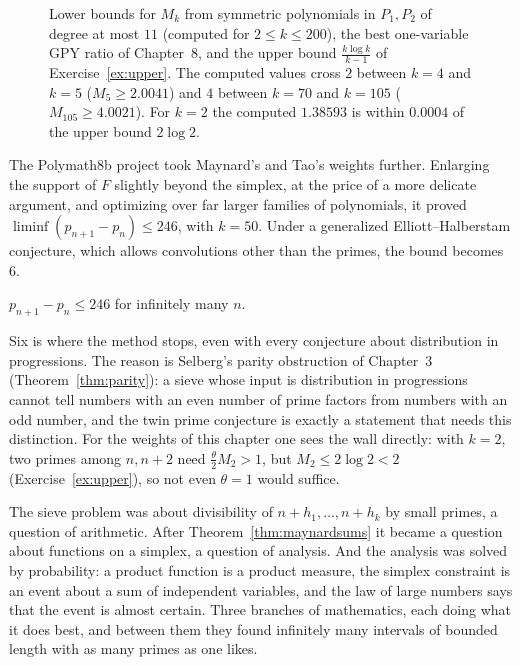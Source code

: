 \begin{figure}[ht]
\centering
{}
\caption{Lower bounds for $M_k$ from symmetric polynomials in $P_1,P_2$ of degree at most $11$ (computed for $2\le k\le200$), the best one-variable GPY ratio of Chapter~8, and the upper bound $\frac{k\log k}{k-1}$ of Exercise~\ref{ex:upper}. The computed values cross $2$ between $k=4$ and $k=5$ ($M_5\ge2.0041$) and $4$ between $k=70$ and $k=105$ ($M_{105}\ge4.0021$). For $k=2$ the computed $1.38593$ is within $0.0004$ of the upper bound $2\log2$.}
\label{fig:mk}
\end{figure}

The Polymath8b project took Maynard's and Tao's weights further. Enlarging the support of $F$ slightly beyond the simplex, at the price of a more delicate argument, and optimizing over far larger families of polynomials, it proved $\liminf(p_{n+1}-p_n)\le246$, with $k=50$. Under a generalized Elliott--Halberstam conjecture, which allows convolutions other than the primes, the bound becomes $6$.

\begin{theorem}\label{thm:246}
$p_{n+1}-p_n\le246$ for infinitely many $n$.
\end{theorem}

Six is where the method stops, even with every conjecture about distribution in progressions. The reason is Selberg's parity obstruction of Chapter~3 (Theorem~\ref{thm:parity}): a sieve whose input is distribution in progressions cannot tell numbers with an even number of prime factors from numbers with an odd number, and the twin prime conjecture is exactly a statement that needs this distinction. For the weights of this chapter one sees the wall directly: with $k=2$, two primes among $n,n+2$ need $\frac\theta2M_2>1$, but $M_2\le2\log2<2$ (Exercise~\ref{ex:upper}), so not even $\theta=1$ would suffice.

\begin{beauty}
The sieve problem was about divisibility of $n+h_1,\dots,n+h_k$ by small primes, a question of arithmetic. After Theorem~\ref{thm:maynardsums} it became a question about functions on a simplex, a question of analysis. And the analysis was solved by probability: a product function is a product measure, the simplex constraint is an event about a sum of independent variables, and the law of large numbers says that the event is almost certain. Three branches of mathematics, each doing what it does best, and between them they found infinitely many intervals of bounded length with as many primes as one likes.
\end{beauty}

